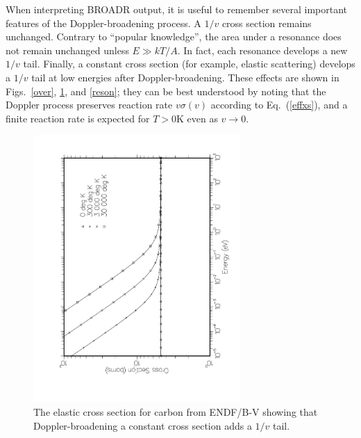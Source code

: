 When interpreting BROADR output, it is useful to remember several
important features of the Doppler-broadening process.
A $1/v$ cross section remains unchanged.  Contrary to ``popular
knowledge'', the area under a resonance does not remain unchanged
unless $E\gg kT/A$.  In fact, each resonance develops a new $1/v$
tail.  Finally, a constant cross section (for example, elastic
scattering) develops a $1/v$ tail at low energies after
Doppler-broadening.  These effects are shown in Figs.~\ref{over},
\ref{elas}, and \ref{reson};  they can be best understood by noting
that the Doppler process preserves reaction rate $v\sigma (v)$
according to Eq.~(\ref{effxs}), and a finite reaction rate is
expected for $T>0$K even as $v\rightarrow 0$.

\begin{figure}[thbp]\centering
\includegraphics[height=4.0in, angle=270]{figs/broadr2ack}
\caption[The $^{nat}$C elastic scattering cross section versus Doppler
 broadening temperature]
{The elastic cross section for carbon
        from ENDF/B-V showing that Doppler-broadening a constant
        cross section adds a $1/v$ tail.}
\label{elas}
\end{figure}

